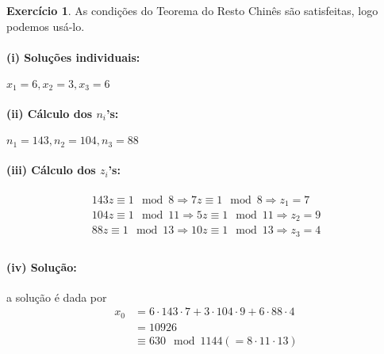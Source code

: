 \documentclass[a4paper,12pt]{article}
\theoremstyle{definition}
\newtheorem{exercise}{Exercício}%
\begin{document}
	\begin{exercise}
		As condições do Teorema do Resto Chinês são satisfeitas, logo podemos usá-lo.
		\paragraph{(i) Soluções individuais:} $x_1 = 6, x_2 = 3, x_3 = 6$
		\paragraph{(ii) Cálculo dos $n_i$'s:} $n_1 = 143, n_2 = 104, n_3 = 88$
		\paragraph{(iii) Cálculo dos $z_i$'s:} 
		\begin{align*}
		143z\equiv 1\mod 8 \Rightarrow 7z\equiv 1\mod 8 \Rightarrow z_1 = 7 \\
		104z\equiv 1\mod 11 \Rightarrow 5z\equiv 1\mod 11 \Rightarrow z_2 = 9 \\
		88z\equiv 1\mod 13 \Rightarrow 10z\equiv 1\mod 13 \Rightarrow z_3 = 4 \\
		\end{align*}
		\paragraph{(iv) Solução:} a solução é dada por
		\begin{align*}
		x_0 &= 6\cdot 143\cdot 7 + 3\cdot 104\cdot 9 + 6\cdot 88\cdot 4 \\
		&= 10926 \\
		&\equiv 630\mod 1144 (= 8\cdot 11\cdot 13)
		\end{align*}
	\end{exercise}
\end{document}
